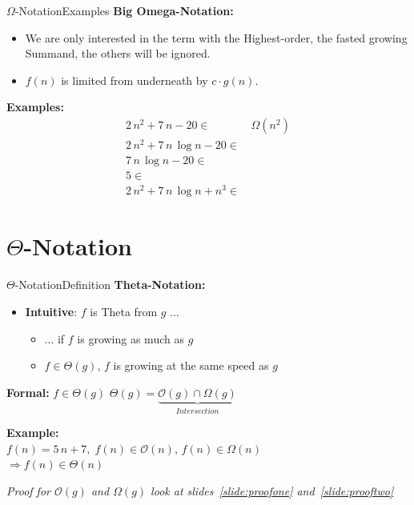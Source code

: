 \begin{frame}{$\Omega$-Notation}{Examples}
  \textbf{Big Omega-Notation:}
  \begin{itemize}
    \item
      We are only interested in the term with the Highest-order, the fasted growing Summand,
      the others will be ignored.
    \item
      $f(n)$ is limited {\color{Mittel-Blau}from underneath} by
      $c \cdot g(n)$.\\
  \end{itemize}
  \textbf{Examples:}
  \begin{align*}
    2 \, n^2 + 7 \, n - 20 \in & \,\Omega(n^2)\\
    2 \, n^2 + 7 \, n \, \log n - 20 \in & {}\\
    7 \, n \, \log n - 20 \in & {}\\
    5 \in & {}\\
    2 \, n^2 + 7 \, n \, \log n + n^3 \in & {}
  \end{align*}
\end{frame}


\section{\texorpdfstring{$\Theta$}{Theta}-Notation}

\begin{frame}{$\Theta$-Notation}{Definition}
  \textbf{Theta-Notation:}
  \begin{itemize}
    \item
      \textbf{Intuitive}: $f$ is Theta from $g$ ...\\
        \begin{itemize}
            \item
              ... if $f$ is growing as much as $g$
            \item
              $f \in \Theta(g)$, $f$ is growing at the same speed as $g$
       \end{itemize}
  \end{itemize}
 	\begin{block}{\textbf{Formal:} $f \in \Theta(g)$}
 		$\Theta(g) = \underbrace{\mathcal O(g) \cap \Omega(g)}_{Intersection}$
 	\end{block}
  \textbf{Example:}\\
  \hspace*{1.5em}$f(n) = 5 \, n + 7, \;
    f(n) \in \mathcal{O}(n), \,
    f(n) \in \Omega(n)$\\
  \hspace*{3.0em}$\Rightarrow f(n) \in \Theta(n)$\\[0.5em]
  \begin{center}
   \textit{Proof for $\mathcal{O}(g)$ and $\Omega(g)$ look at slides~\ref{slide:proofone} and~\ref{slide:prooftwo}}
  \end{center}
\end{frame}


